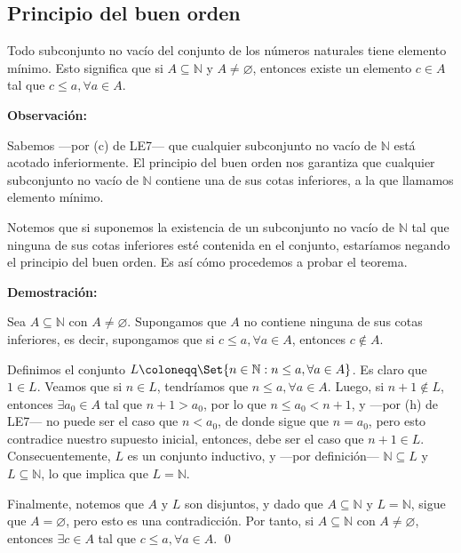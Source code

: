 \documentclass[11pt]{article}
\newcommand{\N}{\mathbb{N}}
\newcommand{\R}{\mathbb{R}}
\newcommand{\defined}{\coloneqq}
\let\for\forall
\let\emptyset\varnothing
\let\set\Set
\begin{document}
\subsection*{Principio del buen orden}

Todo subconjunto no vacío del conjunto de los números naturales tiene elemento mínimo. Esto significa que si $A\subseteq \N$ y $A \neq \emptyset$, entonces existe un elemento $c\in A$ tal que $c\leq a, \forall a\in A$.

\textbf{Observación:}

Sabemos —por (c) de LE7— que cualquier subconjunto no vacío de $\N$ está acotado inferiormente. El principio del buen orden nos garantiza que cualquier subconjunto no vacío de $\N$ contiene una de sus cotas inferiores, a la que llamamos elemento mínimo.

Notemos que si suponemos la existencia de un subconjunto no vacío de $\N$ tal que ninguna de sus cotas inferiores esté contenida en el conjunto, estaríamos negando el principio del buen orden. Es así cómo procedemos a probar el teorema.

\pagebreak

\textbf{Demostración:}

Sea $A\subseteq \N$ con $A\neq \emptyset$. Supongamos que $A$ no contiene ninguna de sus cotas inferiores, es decir, supongamos que si $c\leq a, \forall a\in A$, entonces $c\notin A$.

Definimos el conjunto $L\coloneqq \set{n\in \N: n\leq a, \forall a\in A}$. Es claro que $1\in L$. Veamos que si $n\in L$, tendríamos que $n\leq a, \for a\in A$. Luego, si $n+1\notin L$, entonces $\exists a_0\in A$ tal que $n+1>a_0$, por lo que $n\leq a_0<n+1$, y —por (h) de LE7— no puede ser el caso que $n<a_0$, de donde sigue que $n=a_0$, pero esto contradice nuestro supuesto inicial, entonces, debe ser el caso que $n+1\in L$. Consecuentemente, $L$ es un conjunto inductivo, y —por definición— $\N\subseteq L$ y $L\subseteq \N$, lo que implica que $L=\N$.

Finalmente, notemos que $A$ y $L$ son disjuntos, y dado que $A\subseteq \N$ y $L=\N$, sigue que $A=\emptyset$, pero esto es una contradicción. Por tanto, si $A\subseteq \N$ con $A\neq \emptyset$, entonces $\exists c\in A$ tal que $c\leq a, \forall a\in A$. \qed

%
%
%
%
\end{document}
